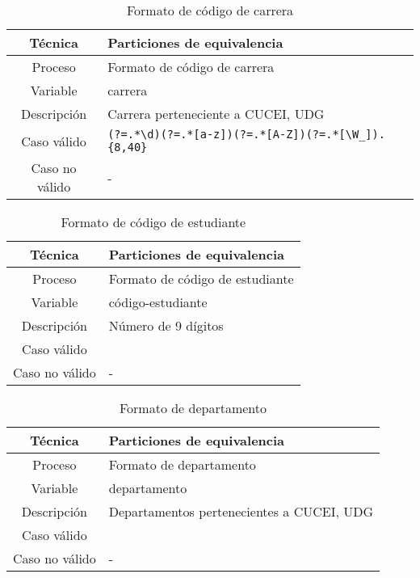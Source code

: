\begin{table}[h!]
	\centering
	\begin{tabular}{|c|p{10cm}|}
		\hline
		\textbf{Técnica} & \textbf{Particiones de equivalencia}                                                     \\
		\hline
		Proceso          & Formato de código de carrera                                                             \\
		\hline
		Variable         & carrera                                                                                  \\
		\hline
		Descripción      & Carrera perteneciente a CUCEI, UDG                                                       \\
		\hline
		Caso válido      & \texttt{(?=.*\textbackslash d)(?=.*[a-z])(?=.*[A-Z])(?=.*[\textbackslash W\_]).\{8,40\}} \\
		\hline
		Caso no válido   & -                                                                                        \\
		\hline
	\end{tabular}
	\caption{Formato de código de carrera}
\end{table}

\begin{table}[h!]
	\centering
	\begin{tabular}{|c|p{10cm}|}
		\hline
		\textbf{Técnica} & \textbf{Particiones de equivalencia} \\
		\hline
		Proceso          & Formato de código de estudiante      \\
		\hline
		Variable         & código-estudiante                    \\
		\hline
		Descripción      & Número de 9 dígitos                  \\
		\hline
		Caso válido      &                                      \\
		\hline
		Caso no válido   & -                                    \\
		\hline
	\end{tabular}
	\caption{Formato de código de estudiante}
\end{table}


\begin{table}[h!]
	\centering
	\begin{tabular}{|c|p{10cm}|}
		\hline
		\textbf{Técnica} & \textbf{Particiones de equivalencia}      \\
		\hline
		Proceso          & Formato de departamento                   \\
		\hline
		Variable         & departamento                              \\
		\hline
		Descripción      & Departamentos pertenecientes a CUCEI, UDG \\
		\hline
		Caso válido      &                                           \\
		\hline
		Caso no válido   & -                                         \\
		\hline
	\end{tabular}
	\caption{Formato de departamento}
\end{table}

